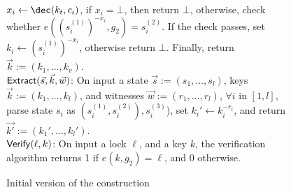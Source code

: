 \begin{figure}[htb]
{{			$x_i \gets \dec(k_t, c_i)$, if $x_i = \bot$, then return $\bot$, otherwise, 
			check whether $e((s_i^{(1)})^{-x_i},g_2) = s_i^{(2)}$. If the check passes, set 
			$k_i \gets (s_i^{(1)})^{-x_i}$, otherwise return $\bot$. Finally, return $\vec{k} := 
			(k_1,\ldots,k_v)$. \\
			\underline{$\mathsf{Extract}(\vec{s}, \vec{k}, \vec{w})$}: On input a state $\vec{s} := 
			(s_1,\ldots,s_l)$, keys $\vec{k} := (k_1,\ldots,k_l)$, and witnesses 
			$\vec{w} := (r_1,\ldots,r_l)$, $\forall i$ in $[1,l]$, parse state $s_i$ as 
			$(s_i^{(1)}, s_i^{(2)}), s_i^{(3)}$), set $k_i' \gets k_i^{-r_i}$, and return 
			$\vec{k'} := (k_1',\ldots,k_l')$. \\
			\underline{$\mathsf{Verify}(\ell, k)$}: On input a lock $\ell$, and a key $k$, the 
			verification algorithm returns 1 if $e(k, g_2) = \ell$, and 0 otherwise.
		}
	}
	\caption{Initial version of the construction}
\end{figure}
